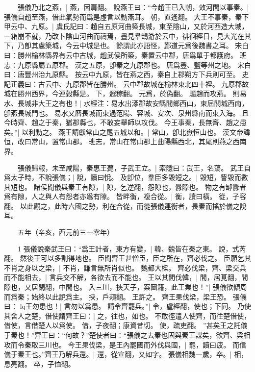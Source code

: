 　　張儀乃北之燕，|{
	燕，因肩翻。
}
說燕王曰：“今趙王已入朝，效河間以事秦。|{
	張儀自趙至燕，借此氣勢而爲是虛言以動燕耳。
	朝，直遙翻。
}
大王不事秦，秦下甲云中、九原。|{
	虞氏記曰：趙自五原河曲築長城，東至陰山，又於河西造大城，一箱崩不就，乃改卜陰山河曲而禱焉，晝見羣鵠游於云中，徘徊經日，見大光在其下，乃卽其處築城，今云中城是也。
	餘謂此亦語怪，酈道元爲後魏書之耳。
	宋白曰：勝州榆林縣界有云中古城，趙武侯所築，秦置云中郡，唐爲單于都護府。
	班志：九原縣屬五原郡。
	漢之五原，卽秦之九原郡也。
	唐爲豐、鹽等州之地。
	宋白曰：唐豐州治九原縣。
	按云中九原，皆在燕之西，秦自上郡朔方下兵則可至。
	史記正義曰：古云中、九原郡皆在勝州。
	云中郡故城在榆林東北四十裡。
	九原郡故城在勝州西界，今連穀縣是。
	下，遐稼翻。
	元爲，於偽翻。
}
驅趙而攻燕。
	則易水、長城非大王之有也！|{
	水經注：易水出涿郡故安縣閻鄉西山，東屆關城西南，卽燕長城門也。
	易水又曆長城而東過范陽、容城、安次、泉州縣南而東入海。
}
且今時齊、趙之于秦，猶郡縣也，不敢妄舉師以攻伐。
	今王事秦，長無齊、趙之患矣。”|{
	以利動之。
}
燕王請獻常山之尾五城以和。|{
	常山，卽北嶽恒山也。
	漢文帝諱恒，改曰常山，置常山郡。
	班志，常山在常山郡上曲陽縣西北，其尾則燕之西南界。
}

　　張儀歸報，未至咸陽，秦惠王薨，子武王立。|{
	索隱曰：武王，名蕩。
}
武王自爲太子時，不說張儀；|{
	說，讀曰悅。
}
及卽位，羣臣多毀短之。|{
	毀短，訾毀而數其短也。
}
諸侯聞儀與秦王有隙，|{
	隙，乞逆翻，怨隙也，釁隙也。
	物之有罅釁者爲有隙，人之與人有怨者亦爲有隙。
}
皆畔衡，複合從。|{
	衡，讀曰橫。
	從，子容翻。
	以此觀之，此時六國之勢，利在合從，而從張儀連衡者，畏秦而搖於儀之說耳。
}

　　五年（辛亥，西元前三一零年）

　　1 張儀說秦武王曰：“爲王計者，東方有變，|{
	韓、魏皆在秦之東。
	說，式芮翻。
}
然後王可以多割得地也。
	臣聞齊王甚憎臣，臣之所在，齊必伐之。
	臣願乞其不肖之身以之梁，|{
	不肖，謙言無所肖似也。
	魏都大樑。
}
齊必伐梁，齊、梁交兵而不能相去，|{
	言兵交不解，各欲去而不能也。
}
王以其間伐韓，|{
	間，居莧翻，間隙也，又居閑翻，中間也。
}
入三川，挾天子，案圖籍，此王業也！”|{
	張儀欲傾周而爲秦；始終以此說爲主。
	挾，戶頰翻。
}
王許之。
	齊王果伐梁，梁王恐。
	張儀曰： lq王勿患也！|{
	言勿以爲患。
}
請令齊罷兵。”|{
	令，盧經翻，使也；下同。
}
乃使其舍人之楚，借使謂齊王曰：|{
	之，往也，如也。
	不敢徑遣人使齊，而往楚借使，借使，言借楚人以爲使。
	借，子夜翻；康資昔切。
	使，疏吏翻。
}
”甚矣王之託儀于秦也！”齊王曰：“何故？”楚使者曰：“張儀之去秦也固與秦王謀矣，欲齊、梁相攻而令秦取三川也。
	今王果伐梁，是王內罷國而外伐與國，|{
	罷，讀曰疲。
}
而信儀于秦王也。”齊王乃解兵還。|{
	還，從宣翻，又如字。
}
張儀相魏一歲，卒。|{
	相，息亮翻。
	卒，子恤翻。
}

